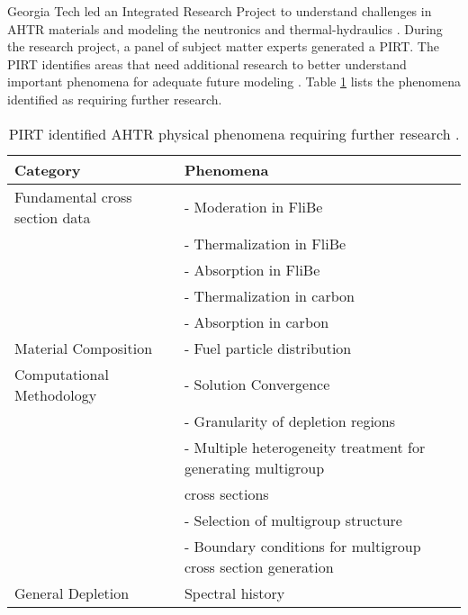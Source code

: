 \gls{Georgia Tech} led an Integrated Research Project to 
understand challenges in \gls{AHTR} materials and modeling the neutronics and 
thermal-hydraulics \cite{zhang_integrated_2019}. 
During the research project, a panel of subject matter experts 
generated a \gls{PIRT}.
The \gls{PIRT} identifies areas that need additional research to better 
understand important phenomena for adequate future modeling
\cite{rahnema_phenomena_2019}. 
Table \ref{tab:phenomena} lists the phenomena identified as requiring further 
research. 

\begin{table}[]
    \centering
    \onehalfspacing
    \caption{\acrlong{PIRT} identified \acrlong{AHTR} physical phenomena requiring 
    further research \cite{rahnema_phenomena_2019}.}
	\label{tab:phenomena}
    \small
    \begin{tabular}{l|l}
    \hline
    \textbf{Category} & \textbf{Phenomena} \\ \hline
    Fundamental cross section data & - Moderation in FliBe \\
    & - Thermalization in FliBe \\
    & - Absorption in FliBe \\
    & - Thermalization in carbon \\
    & - Absorption in carbon \\ \hline
    Material Composition & - Fuel particle distribution \\ \hline
    Computational Methodology & - Solution Convergence \\ 
    & - Granularity of depletion regions \\
    & - Multiple heterogeneity treatment for generating multigroup \\ 
    & cross sections \\
    & - Selection of multigroup structure \\
    & - Boundary conditions for multigroup cross section generation \\ \hline 
    General Depletion & Spectral history \\ \hline 
    \end{tabular}
    \end{table}

